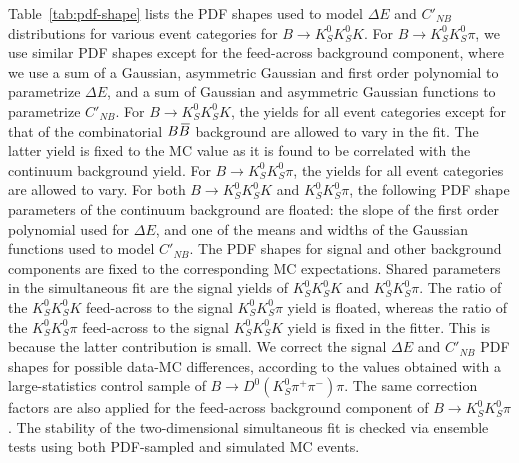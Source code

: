 \documentclass[aps,prl,preprint,tightenlines,superscriptaddress,,amsmath,byrevtex]{revtex4}
\def\pip    {\ensuremath{\pi^+}\xspace}
\def\pim    {\ensuremath{\pi^-}\xspace}
\def\KS     {\ensuremath{K^0_{\scriptscriptstyle S}}\xspace}
\def\Dz     {\ensuremath{D^0}\xspace}
\def\Bbar   {\kern 0.18em\overline{\kern -0.18em B}{}\xspace}
\def\BB     {\ensuremath{B\Bbar}\xspace}
\def\DeltaE {\mbox{$\Delta E$}\xspace}
\def\to{\ensuremath{\rightarrow}\xspace}
\def\nbprim{\ensuremath{C'_{N\!B}}\xspace}
\begin{document}
Table~\ref{tab:pdf-shape} lists the PDF shapes used to model $\DeltaE$ and
$\nbprim$ distributions for various event categories for $B\to\KS\KS K$. 
For $B\to\KS\KS \pi$, we use similar PDF shapes except for the feed-across
background component, where we use a sum of a Gaussian, asymmetric 
Gaussian and first order polynomial to parametrize 
$\DeltaE$, and a sum of  Gaussian and asymmetric Gaussian functions to 
parametrize $\nbprim$. For $B\to\KS\KS K$, the yields for all event 
categories except for that of the combinatorial $\BB$ background are 
allowed to vary in the fit. The latter yield is fixed to the MC value as it is found to be correlated with the continuum background yield. For $B\to\KS\KS \pi$, the yields for all 
event categories are allowed to vary. For both $B\to\KS\KS K$ and 
$\KS\KS\pi$, the following PDF shape parameters of the continuum background
are floated: the slope of the first order polynomial used for $\DeltaE$, and 
one of the means and widths of the Gaussian functions used to
model $\nbprim$. The PDF shapes for signal and other background
components are fixed to the corresponding MC expectations. Shared parameters in the simultaneous
fit are the signal yields of $\KS\KS K$ and $\KS\KS\pi$. The ratio of the $\KS\KS K$ feed-across to 
the signal $\KS\KS\pi$ yield is floated, whereas the ratio of the $\KS\KS\pi$ 
feed-across to the signal $\KS\KS K$ yield is fixed in the fitter. This is because the latter contribution is small. We correct the signal $\DeltaE$ and $\nbprim$ 
PDF shapes for possible data-MC differences, according to the values 
obtained with a large-statistics control sample of $B\to\Dz(\KS\pip\pim)\pi$. 
The same correction factors are also applied for the feed-across 
background component of $B\to\KS\KS\pi$. The stability of the two-dimensional simultaneous fit is checked via ensemble tests using both PDF-sampled and simulated MC events.
\end{document}
